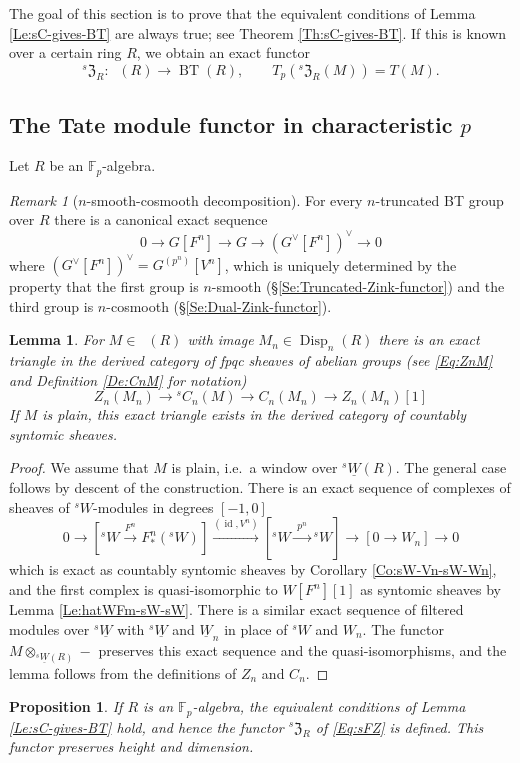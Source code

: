 \documentclass[a4paper,11pt]{amsart}
\theoremstyle{plain}
\newtheorem{Lemma}[equation]{Lemma}
\newtheorem{Prop}[equation]{Proposition}
\theoremstyle{definition}
\theoremstyle{remark}
\newtheorem{Remark}[equation]{Remark}
\newcommand{\bLe}{\begin{Lemma}}
\newcommand{\eLe}{\end{Lemma}}
\newcommand{\bPr}{\begin{Prop}}
\newcommand{\ePr}{\end{Prop}}
\newcommand{\bRe}{\begin{Remark}}
\newcommand{\eRe}{\end{Remark}}
\newcommand{\bproof}{\begin{proof}}
\newcommand{\eproof}{\end{proof}}
\newcommand{\beqn}{\begin{equation}}
\newcommand{\eeqn}{\end{equation}}
\renewcommand{\u}{\underline}
\newcommand{\uM}{M} %
\numberwithin{equation}{section}
\newcommand{\FZ}{\mathfrak{Z}}
\newcommand{\FF}{{\mathbb{F}}}
\DeclareMathOperator{\id}{id}
\DeclareMathOperator{\BT}{BT}
\DeclareMathOperator{\Disp}{Disp}
\DeclareMathOperator{\sDisp}{{}^sDisp}
\newcommand{\sC}{{}^{s}C}
\newcommand{\sFZ}{{}^s\FZ}
\newcommand{\sW}{{}^sW}
\newcommand{\usW}{{}^s\u W}
\begin{document}
The goal of this section is to prove that the equivalent conditions of Lemma \ref{Le:sC-gives-BT} are always true; see Theorem \ref{Th:sC-gives-BT}. If this is known over a certain ring $R$, we obtain an exact functor
\beqn
\label{Eq:sFZ}
\sFZ_R\colon \sDisp(R)\to\BT(R),\qquad T_p(\sFZ_R(\uM))=T(\uM).
\eeqn

\subsection{The Tate module functor in characteristic $p$} 
\label{Se:Tate:char-p}

Let $R$ be an $\FF_p$-algebra. 

\bRe[$n$-smooth-cosmooth decomposition]
For every $n$-truncated BT group over $R$ there is a canonical exact sequence
\[
0\to G[F^n]\to G\to (G^\vee[F^n])^\vee\to 0
\]
where $(G^\vee[F^n])^\vee=G^{(p^n)}[V^n]$, which is uniquely determined by the property that the first group is $n$-smooth (\S\ref{Se:Truncated-Zink-functor}) and the third group is $n$-cosmooth (\S\ref{Se:Dual-Zink-functor}).
\eRe

\bLe
\label{Le:fiber-sequence-sCn-Cn}
For $\uM\in\sDisp(R)$ with image $\uM_n\in\Disp_n(R)$ there is an exact triangle in the derived category of fpqc sheaves of abelian groups (see \eqref{Eq:ZnM} and Definition \ref{De:CnM} for notation)
\[
Z_n(\uM_n)\to \sC_n(\uM)\to C_n(\uM_n)\to Z_n(\uM_n)[1]
\]
If $\uM$ is plain, this exact triangle exists in the derived category of countably syntomic sheaves.
\eLe

\bproof
We assume that $\uM$ is plain, i.e.\ a window over $\usW(R)$.
The general case follows by descent of the construction.
There is an exact sequence of complexes of sheaves of $\sW$-modules in degrees $[-1,0]$
\[
0\longrightarrow
[\sW\xrightarrow{F^n}F^n_*(\sW)]\xrightarrow{(\id,V^n)}[\sW\xrightarrow{\;p^n\;}\sW]\longrightarrow[0\to W_n]
\longrightarrow0
\]
which is exact as countably syntomic sheaves by Corollary \ref{Co:sW-Vn-sW-Wn}, and the first complex is quasi-isomorphic to $\hat W[F^n][1]$ as syntomic sheaves by Lemma \ref{Le:hatWFm-sW-sW}.
There is a similar exact sequence of filtered modules over $\usW$ with $\usW$ and $\u{W\!}_n$ in place of $\sW$ and $W_n$. The functor $\uM\otimes_{\usW(R)}-$ preserves this exact sequence and the quasi-isomorphisms, and the lemma follows from the definitions of $Z_n$ and $C_n$.
\eproof

\bPr
\label{Pr:sC-gives-BT-FFp}
If $R$ is an $\FF_p$-algebra, the equivalent conditions of Lemma \ref{Le:sC-gives-BT} hold, and hence the functor $\sFZ_R$ of \eqref{Eq:sFZ} is defined. This functor preserves height and dimension.
\ePr
\end{document}
